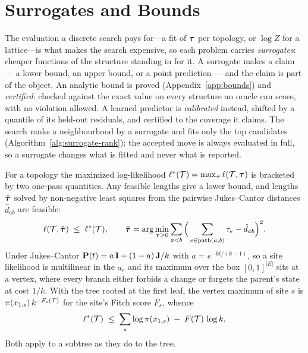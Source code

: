 \documentclass[11pt,a4paper]{article}
\begin{document}
\section{Surrogates and Bounds}
\label{sec:surrogates}
The evaluation a discrete search pays for---a fit of $\boldsymbol{\tau}$ per topology,
or $\log Z$ for a lattice---is what makes the search expensive, so each
problem carries \emph{surrogates}: cheaper functions of the structure standing
in for it. A surrogate makes a claim --- a lower bound, an upper bound, or a
point prediction --- and the claim is part of the object. An analytic bound is
proved (Appendix~\ref{app:bounds}) and \emph{certified}: checked against the
exact value on every structure an oracle can score, with no violation allowed.
A learned predictor is \emph{calibrated} instead, shifted by a quantile of its
held-out residuals, and certified to the coverage it claims. The search ranks a
neighbourhood by a surrogate and fits only the top candidates
(Algorithm~\ref{alg:surrogate-rank}); the accepted move is always evaluated in
full, so a surrogate changes what is fitted and never what is reported.

For a topology the maximized log-likelihood $\ell^\ast(\mathcal{T}) = \max_{\boldsymbol{\tau}}
\ell(\mathcal{T}, \boldsymbol{\tau})$ is bracketed by two one-pass quantities. Any feasible
lengths give a lower bound, and lengths $\hat{\boldsymbol{\tau}}$ solved by
non-negative least squares from the pairwise Jukes--Cantor distances
$\hat d_{ab}$ are feasible:
\begin{equation}
  \ell(\mathcal{T}, \hat{\boldsymbol{\tau}}) \;\le\; \ell^\ast(\mathcal{T}),
  \qquad
  \hat{\boldsymbol{\tau}} = \arg\min_{\boldsymbol{\tau} \ge 0}
    \sum_{a<b} \Big(\sum_{e \in \mathrm{path}(a,b)} \tau_e - \hat d_{ab}\Big)^2 .
  \label{eq:plugin-bound}
\end{equation}
Under Jukes--Cantor $\mathbf{P}(t) = a\,\mathbf{I} + (1-a)\,\mathbf{J}/k$ with
$a = e^{-kt/(k-1)}$, so a site likelihood is multilinear in the $a_e$ and its
maximum over the box $[0,1]^{|E|}$ sits at a vertex, where every branch
either forbids a change or forgets the parent's state at cost $1/k$. With the
tree rooted at the first leaf, the vertex maximum of site $s$ is
$\pi(x_{1,s})\,k^{-F_s(\mathcal{T})}$ for the site's Fitch score $F_s$, whence
\begin{equation}
  \ell^\ast(\mathcal{T}) \;\le\; \sum_s \log \pi(x_{1,s}) \;-\; F(\mathcal{T})\,\log k .
  \label{eq:parsimony-bound}
\end{equation}
Both apply to a subtree as they do to the tree.
\end{document}
